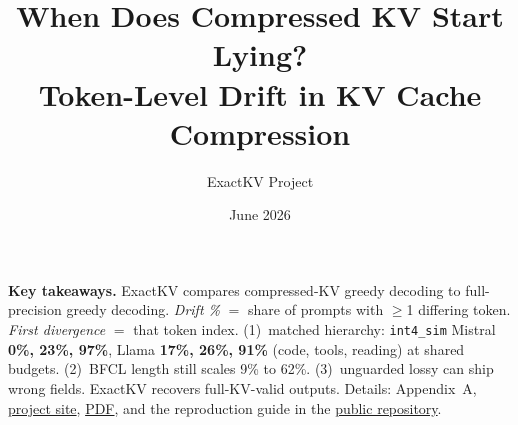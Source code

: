 \documentclass[11pt]{article}
\title{\textbf{When Does Compressed KV Start Lying?}\\[0.4em]
\large Token-Level Drift in KV Cache Compression}
\author{ExactKV Project}
\date{June 2026}
\begin{document}
\maketitle

\noindent\textbf{Key takeaways.}
ExactKV compares compressed-KV greedy decoding to full-precision greedy decoding.
\emph{Drift \%} $=$ share of prompts with $\geq$1 differing token.
\emph{First divergence} $=$ that token index.
(1)~matched hierarchy: \texttt{int4\_sim} Mistral \textbf{0\%, 23\%, 97\%}, Llama
\textbf{17\%, 26\%, 91\%} (code, tools, reading) at shared budgets.
(2)~BFCL length still scales 9\% to 62\%.
(3)~unguarded lossy can ship wrong fields. ExactKV recovers full-KV-valid outputs.
Details: Appendix~A,
\href{https://utkarshg20.github.io/ExactKV/}{project site},
\href{https://drive.google.com/file/d/1W2_dyc1QOBHTjc94yKPpQ-j7JKk04dln/view?usp=sharing}{PDF},
and the reproduction guide in the
\href{https://github.com/utkarshg20/ExactKV}{public repository}.
\end{document}
